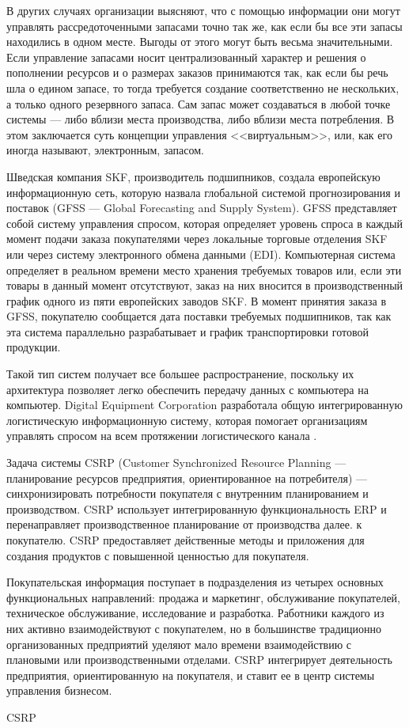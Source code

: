 В других случаях организации выясняют, что с помощью информации они могут управлять рассредоточенными запасами точно так же, как если бы все эти запасы находились в одном месте.
Выгоды от этого могут быть весьма значительными.
Если управление запасами носит централизованный характер и решения о пополнении ресурсов и о размерах заказов принимаются так, как если бы речь шла о едином запасе, то тогда требуется создание соответственно не нескольких, а только одного резервного запаса.
Сам запас может создаваться в любой точке системы --- либо вблизи места производства, либо вблизи места потребления.
В этом заключается суть концепции управления <<виртуальным>>, или, как его иногда называют, электронным, запасом.

Шведская компания SKF, производитель подшипников, создала европейскую информационную сеть, которую назвала глобальной системой прогнозирования и поставок (GFSS --- Global Forecasting and Supply System).
GFSS представляет собой систему управления спросом, которая определяет уровень спроса в каждый момент подачи заказа покупателями через локальные торговые отделения SKF или через систему электронного обмена данными (EDI).
Компьютерная система определяет в реальном времени место хранения требуемых товаров или, если эти товары в данный момент отсутствуют, заказ на них вносится в производственный график одного из пяти европейских заводов SKF.
В момент принятия заказа в GFSS, покупателю сообщается дата поставки требуемых подшипников, так как эта система параллельно разрабатывает и график транспортировки готовой продукции.

Такой тип систем получает все большее распространение, поскольку их архитектура позволяет легко обеспечить передачу данных с компьютера на компьютер.
Digital Equipment Corporation разработала общую интегрированную логистическую информационную систему, которая помогает организациям управлять спросом на всем протяжении логистического канала \cite[с. 225--228]{christopher}.

Задача системы CSRP (Customer Synchronized Resource Planning --- планирование ресурсов предприятия, ориентированное на потребителя) --- синхронизировать потребности покупателя с внутренним планированием и производством.
CSRP использует интегрированную функциональность ERP и перенаправляет производственное планирование от производства далее. к покупателю.
CSRP предоставляет действенные методы и приложения для создания продуктов с повышенной ценностью для покупателя.

Покупательская информация поступает в подразделения из четырех основных функциональных направлений: продажа и маркетинг, обслуживание покупателей, техническое обслуживание, исследование и разработка.
Работники каждого из них активно взаимодействуют с покупателем, но в большинстве традиционно организованных предприятий уделяют мало времени взаимодействию с плановыми или производственными отделами.
CSRP интегрирует деятельность предприятия, ориентированную на покупателя, и ставит ее в центр системы управления бизнесом.

CSRP 






